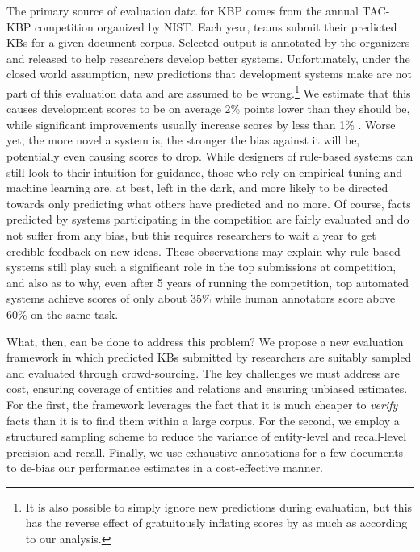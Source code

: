 The primary source of evaluation data for KBP comes from the annual TAC-KBP competition organized by NIST.\@ %
Each year, teams submit their predicted KBs for a given document corpus.
Selected output is annotated by the organizers and released to help researchers develop better systems.
Unfortunately, under the closed world assumption, new predictions that development systems make are not part of this evaluation data and are assumed to be wrong.\footnote{%
It is also possible to simply ignore new predictions during evaluation, but this has the reverse effect of gratuitously inflating scores by as much as  according to our analysis.}
We estimate that this causes development \fone{} scores to be on average 2\% points lower than they should be, while significant improvements usually increase scores by less than 1\% \fone{}.
Worse yet, the more novel a system is, the stronger the bias against it will be, potentially even causing scores to drop.
While designers of rule-based systems can still look to their intuition for guidance, those who rely on empirical tuning and machine learning are, at best, left in the dark, and more likely to be directed towards only predicting what others have predicted and no more.
Of course, facts predicted by systems participating in the competition are fairly evaluated and do not suffer from any bias, but this requires researchers to wait a year to get credible feedback on new ideas.
%
These observations may explain why rule-based systems still play such a significant role in the top submissions at competition, and also as to why, even after 5 years of running the competition, top automated systems achieve scores of only about 35\%\fone{} while human annotators score above 60\%\fone{} on the same task.

What, then, can be done to address this problem?
We propose a new evaluation framework in which predicted KBs submitted by researchers are suitably sampled and evaluated through crowd-sourcing.
The key challenges we must address are cost, ensuring coverage of entities and relations and ensuring unbiased estimates.
For the first, the framework leverages the fact that it is much cheaper to \textit{verify} facts than it is to find them within a large corpus.
For the second, we employ a structured sampling scheme to reduce the variance of entity-level and recall-level precision and recall.
Finally, we use exhaustive annotations for a few documents to de-bias our performance estimates in a cost-effective manner.

